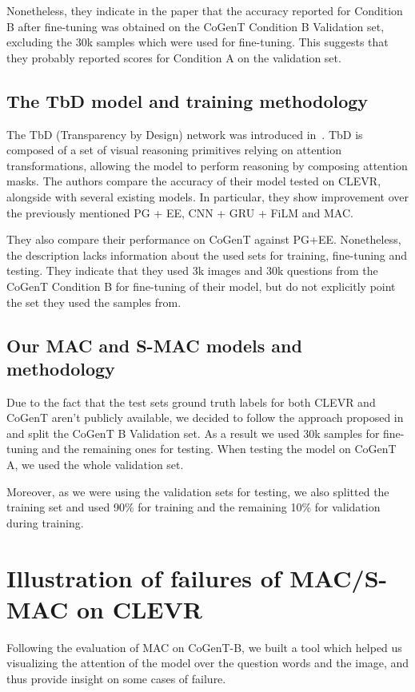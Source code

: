 Nonetheless, they indicate in the paper that the accuracy reported for Condition B after fine-tuning was obtained on the CoGenT Condition B Validation set, excluding the 30k samples which were used for fine-tuning.
This suggests that they probably reported scores for Condition A on the validation set.


\subsection{The TbD model and training methodology}

The TbD (Transparency by Design) network was introduced in~\cite{mascharka2018transparency}.
TbD is composed of a set of visual reasoning primitives relying on attention transformations, allowing the model to perform reasoning by composing attention masks.
The authors compare the accuracy of their model tested on CLEVR, alongside with several existing models. In particular, they show improvement over the previously mentioned PG + EE, CNN + GRU + FiLM and MAC.

They also compare their performance on CoGenT against PG+EE.
Nonetheless, the description lacks information about the used sets for training, fine-tuning and testing. 
They indicate that they used 3k images and 30k questions from the CoGenT Condition B for fine-tuning of their model, but do not explicitly point the set they used the samples from.


\subsection{Our MAC and S-MAC models and methodology}

Due to the fact that the test sets ground truth labels for both CLEVR and CoGenT aren't publicly available, we decided to follow the approach proposed in~\cite{perez2017film} and split the CoGenT B Validation set.
As a result we used 30k samples for fine-tuning and the remaining ones for testing.
When testing the model on CoGenT A, we used the whole validation set.

Moreover, as we were using the validation sets for testing, we also splitted the training set and used 90\% for training and the remaining 10\% for validation during training.		

\newpage
\section{Illustration of failures of MAC/S-MAC on CLEVR}
Following the evaluation of MAC on CoGenT-B, we built a tool which helped us visualizing the attention of the model over the question words and the image, and thus provide insight on some cases of failure.

